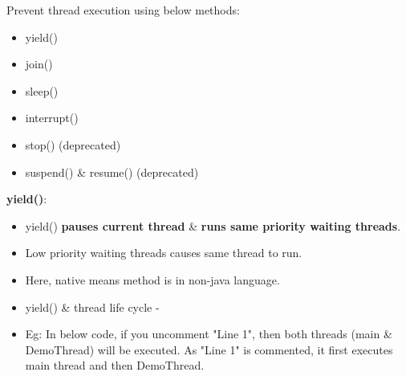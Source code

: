 \setlength{\columnsep}{3pt}
\begin{flushleft}

	Prevent thread execution using below methods:
	\begin{itemize}
		\item yield()
		\item join()
		\item sleep()
		\item interrupt()
		\item stop() (deprecated)
		\item suspend() \& resume() (deprecated)
	\end{itemize}	

	\textbf{yield()}:
		\begin{itemize}
			\item yield() \textbf{pauses current thread} \& \textbf{runs same priority waiting threads}.
			\item Low priority waiting threads causes same thread to run.
			\bigskip
			\item Here, native means method is in non-java language.
			\item yield() \& thread life cycle - 
			\item Eg: In below code, if you uncomment "Line 1", then both threads (main \& DemoThread) will be executed. As "Line 1" is commented, it first executes main thread and then DemoThread.
			\bigskip
			\bigskip
		\end{itemize}
	

\end{flushleft}
